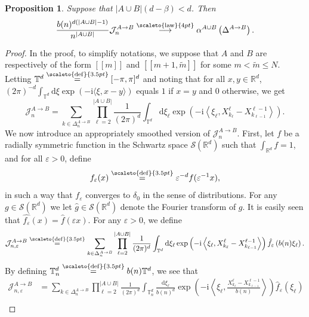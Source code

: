 \documentclass[12pt]{article}
\newcommand{\RR}{\mathbb R}
\newcommand{\J}{\mathcal J}
\newcommand{\TT}{\mathbb T}
\newcommand{\1}{\mathds{1}}
\renewcommand{\d}{\mathrm d}
\renewcommand{\i}{\mathrm i}
\newcommand{\distribution}{\stackrel{\scaleto{\mathrm{law}}{4pt}}{\longrightarrow}}
\newcommand{\eqdef}{\stackrel{\scaleto{\mathrm{def}}{3.5pt}}{=}}
\newtheorem{proposition}{Proposition}
\numberwithin{equation}{section}
\begin{document}
\begin{proposition}
\label{theorem:discrete ILT convergence in distribution to continuous ILT}
    Suppose that $|A\cup B|(d-\beta)<d$. Then
    \begin{equation*}
        \frac{b(n)^{d(|A\cup B|-1)}}{n^{|A\cup B|}}\mathcal J_n^{A\rightarrow B}\distribution \alpha^{A\cup B}\left(\Delta^{A\rightarrow B}\right).
    \end{equation*}
\end{proposition}

\begin{proof}
    In the proof, to simplify notations, we suppose that $A$ and $B$ are respectively of the form $[\![m]\!]$ and $[\![m+1,\widetilde m]\!]$ for some $m<\widetilde m\le N$. Letting $\TT^d\eqdef[-\pi,\pi]^d$ and noting that for all $x,y\in\RR^d$, $(2\pi)^{-d}\int_{\TT^d}\d\xi\exp(-\i\langle\xi,x-y\rangle)$ equals $1$ if $x=y$ and $0$ otherwise, we get
    \begin{equation*}
        \mathcal J_n^{A\rightarrow B}=\sum_{k\in\Delta_n^{A\rightarrow B}}\prod_{\ell=2}^{|A\cup B|}\frac{1}{(2\pi)^d}\int_{\TT^d}\d\xi_\ell\exp\left(-\i\left\langle\xi_\ell,X_{k_\ell}^{\ell}-X_{k_{\ell-1}}^{{\ell-1}}\right\rangle\right).
    \end{equation*}
    We now introduce an appropriately smoothed version of $\J_n^{A\rightarrow B}$. First, let $f$ be a radially symmetric function in the Schwartz space $\mathcal S(\RR^d)$ such that $\int_{\RR^d} f=1$, and for all $\varepsilon>0$, define 
    \begin{equation*}
        f_\varepsilon(x)\eqdef\varepsilon^{-d}f(\varepsilon^{-1}x),
    \end{equation*}
    in such a way that $f_\varepsilon$ converges to $\delta_0$ in the sense of distributions. For any $g\in\mathcal S(\RR^d)$ we let $\hat g\in\mathcal S(\RR^d)$ denote the Fourier transform of $g$. It is easily seen that $\hat{f_\varepsilon}(x)=\hat f(\varepsilon x)$. For any $\varepsilon>0$, we define
    \begin{equation*}
        \mathcal J_{n,\varepsilon}^{A\rightarrow B}\eqdef\sum_{k\in\Delta_n^{A\rightarrow B}}\prod_{\ell=2}^{|A\cup B|}\frac{1}{(2\pi)^d}\int_{\TT^d}\d\xi_\ell\exp\left(-\i\left\langle\xi_\ell,X_{k_\ell}^{\ell}-X_{k_{\ell-1}}^{{\ell-1}}\right\rangle\right)\hat f_\varepsilon \left(b(n)\xi_\ell\right).
    \end{equation*}
    By defining $\TT_n^d\eqdef b(n)\TT^d$, we see that
    \begin{align*}
        \mathcal J_{n,\varepsilon}^{A\rightarrow B}&=\sum_{k\in\Delta_n^{A\rightarrow B}}\prod_{\ell=2}^{|A\cup B|}\frac{1}{(2\pi)^d}\int_{\TT_n^d}\frac{\d\xi_\ell}{b(n)^d}\exp\left(-\i\left\langle\xi_\ell,\frac{X_{k_\ell}^{\ell}-X_{k_{\ell-1}}^{{\ell-1}}}{b(n)}\right\rangle\right)\hat f_\varepsilon(\xi_\ell)\\

\end{align*}
\end{proof}
\end{document}
